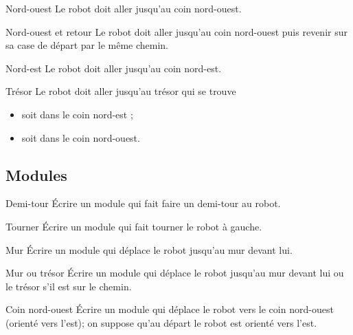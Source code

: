 		\begin{Exercice}{Nord-ouest}
			Le robot doit aller jusqu’au coin nord-ouest.
		\end{Exercice}

		\begin{Exercice}{Nord-ouest et retour}
			Le robot doit aller jusqu’au coin nord-ouest
			puis revenir sur sa case de départ par le même chemin.
		\end{Exercice}

		\begin{Exercice}{Nord-est}
			Le robot doit aller jusqu’au coin nord-est.
		\end{Exercice}

		\begin{Exercice}{Trésor}
			Le robot doit aller jusqu’au trésor qui se trouve
			\begin{itemize}
			\item soit dans le coin nord-est ;
			\item soit dans le coin nord-ouest.
			\end{itemize}
		\end{Exercice}

	\subsection{Modules}

		\begin{Exercice}{Demi-tour}
			Écrire un module qui fait faire un demi-tour au robot.
		\end{Exercice}

		\begin{Exercice}{Tourner}
			Écrire un module qui fait tourner le robot à gauche.
		\end{Exercice}

		\begin{Exercice}{Mur}
			Écrire un module qui déplace le robot
			jusqu’au mur devant lui.
		\end{Exercice}

		\begin{Exercice}{Mur ou trésor}
			Écrire un module qui déplace le robot jusqu’au mur
			devant lui ou le trésor s’il est sur le chemin.
		\end{Exercice}

		\begin{Exercice}{Coin nord-ouest}
			Écrire un module qui déplace le robot vers le coin nord-ouest 
			(orienté vers l’est); on suppose qu’au départ
			le robot est orienté vers l’est.
		\end{Exercice}


